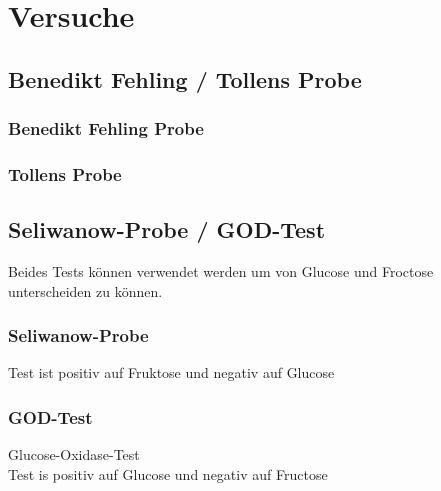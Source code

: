 
\section{Versuche}
\subsection{Benedikt Fehling / Tollens Probe}
\subsubsection{Benedikt Fehling Probe}
\subsubsection{Tollens Probe}

\subsection{Seliwanow-Probe / GOD-Test}
Beides Tests können verwendet werden um von Glucose und Froctose unterscheiden zu können.
\subsubsection{Seliwanow-Probe}
Test ist positiv auf Fruktose und negativ auf Glucose
\subsubsection{GOD-Test}
Glucose-Oxidase-Test \\
Test is positiv auf Glucose und negativ auf Fructose


